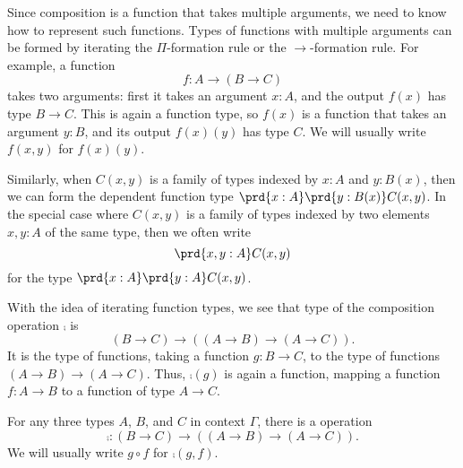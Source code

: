 \begin{rmk}
  Since composition is a function that takes multiple arguments, we need to know how to represent such functions. Types of functions with multiple arguments can be formed by iterating the $\Pi$-formation rule or the $\to$-formation rule. For example, a function
  \begin{equation*}
    f:A\to (B\to C)
  \end{equation*}
  takes two arguments: first it takes an argument $x:A$, and the output $f(x)$ has type $B\to C$. This is again a function type, so $f(x)$ is a function that takes an argument $y:B$, and its output $f(x)(y)$ has type $C$. We will usually write $f(x,y)$ for $f(x)(y)$.

  Similarly, when $C(x,y)$ is a family of types indexed by $x:A$ and $y:B(x)$, then we can form the dependent function type $\prd{x:A}\prd{y:B(x)}C(x,y)$. In the special case where $C(x,y)$ is a family of types indexed by two elements $x,y:A$ of the same type, then we often write
  \begin{equation*}
    \prd{x,y:A}C(x,y)
  \end{equation*}
  for the type $\prd{x:A}\prd{y:A}C(x,y)$.

  With the idea of iterating function types, we see that type of the composition operation $\comp$ is
  \begin{equation*}
    (B\to C)\to ((A\to B)\to (A\to C)).
  \end{equation*}
  It is the type of functions, taking a function $g:B\to C$, to the type of functions $(A\to B)\to (A\to C)$. Thus, $\comp(g)$ is again a function, mapping a function $f:A\to B$ to a function of type $A\to C$.
\end{rmk}

\begin{defn}
For any three types $A$, $B$, and $C$ in context $\Gamma$, there is a  operation
\begin{equation*}
\comp:(B\to C)\to ((A\to B)\to (A\to C)).
\end{equation*}
We will usually write $g\circ f$ for $\comp(g,f)$.
\end{defn}

